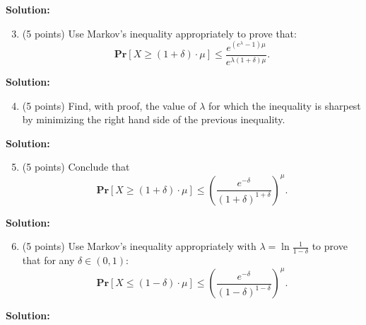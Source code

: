 \documentclass[11pt]{article}
\newcommand{\PPr}[1]{\ensuremath{\mathbf{Pr}\left[#1\right]}}
\begin{document}
\noindent\textbf{Solution:}




\begin{enumerate}
\setcounter{enumi}{2}
\item (5 points)
Use Markov's inequality appropriately to prove that:
\[\PPr{X\ge(1+\delta)\cdot\mu}\le\frac{e^{(e^\lambda-1)\mu}}{e^{\lambda(1+\delta)\mu}}.\]
\end{enumerate}

\noindent\textbf{Solution:}





\begin{enumerate}
\setcounter{enumi}{3}
\item (5 points)
Find, with proof, the value of $\lambda$ for which the inequality is sharpest by minimizing the right hand side of the previous inequality. 
\end{enumerate}

\noindent\textbf{Solution:}




\begin{enumerate}
\setcounter{enumi}{4}
\item (5 points)
Conclude that
\[\PPr{X\ge(1+\delta)\cdot\mu}\le\left(\frac{e^{-\delta}}{(1+\delta)^{1+\delta}}\right)^\mu.\]
\end{enumerate}

\noindent\textbf{Solution:}





\begin{enumerate}
\setcounter{enumi}{5}
\item (5 points)
Use Markov's inequality appropriately with $\lambda=\ln\frac{1}{1-\delta}$ to prove that for any $\delta\in(0,1)$:
\[\PPr{X\le(1-\delta)\cdot\mu}\le\left(\frac{e^{-\delta}}{(1-\delta)^{1-\delta}}\right)^\mu.\]
\end{enumerate}

\noindent\textbf{Solution:}
\end{document}
